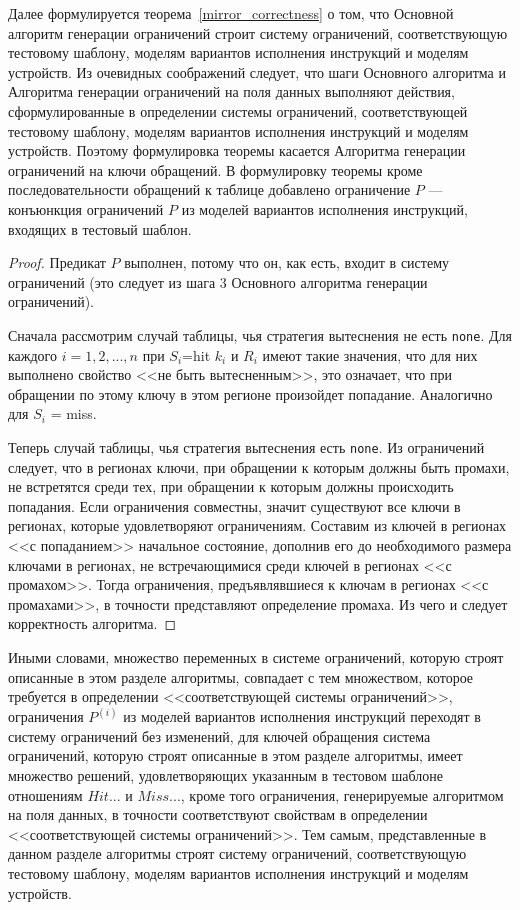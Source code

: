 Далее формулируется теорема~\ref{mirror_correctness} о том, что Основной алгоритм генерации ограничений строит систему ограничений, соответствующую тестовому шаблону, моделям вариантов исполнения инструкций и моделям устройств. Из очевидных соображений следует, что шаги Основного алгоритма и Алгоритма генерации ограничений на поля данных выполняют действия, сформулированные в определении системы ограничений, соответствующей тестовому шаблону, моделям вариантов исполнения инструкций и моделям устройств. Поэтому формулировка теоремы касается Алгоритма генерации ограничений на ключи обращений. В формулировку теоремы кроме последовательности обращений к таблице добавлено ограничение $P$ --- конъюнкция ограничений $P$ из моделей вариантов исполнения инструкций, входящих в тестовый шаблон.

\begin{theorem}\label{mirror_correctness}
\CorrectnessMirror
\end{theorem}
\begin{proof}
  Предикат $P$ выполнен, потому что он, как есть, входит в систему ограничений (это следует из шага 3 Основного алгоритма генерации ограничений).

  Сначала рассмотрим случай таблицы, чья стратегия вытеснения не есть \texttt{none}. Для каждого $i = 1, 2, ..., n$ при $S_i${=}hit  $k_i$ и $R_i$ имеют такие значения, что для них выполнено свойство <<не быть вытесненным>>, это означает, что при обращении по этому ключу в этом регионе произойдет попадание. Аналогично для $S_i$ = miss.

  Теперь случай таблицы, чья стратегия вытеснения есть \texttt{none}. Из ограничений следует, что в регионах ключи, при обращении к которым должны быть промахи, не встретятся среди тех, при обращении к которым должны происходить попадания. Если ограничения совместны, значит существуют все ключи в регионах, которые удовлетворяют ограничениям. Составим из ключей в регионах <<с попаданием>> начальное состояние, дополнив его до необходимого размера ключами в регионах, не встречающимися среди ключей в регионах <<с промахом>>. Тогда ограничения, предъявлявшиеся к ключам в регионах <<с промахами>>, в точности представляют определение промаха. Из чего и следует корректность алгоритма.
\end{proof}

Иными словами, множество переменных в системе ограничений, которую строят описанные в этом разделе алгоритмы, совпадает с тем множеством, которое требуется в определении <<соответствующей системы ограничений>>, ограничения $P^{(i)}$ из моделей вариантов исполнения инструкций переходят в систему ограничений без изменений, для ключей обращения система ограничений, которую строят описанные в этом разделе алгоритмы, имеет множество решений, удовлетворяющих указанным в тестовом шаблоне отношениям $Hit...$ и $Miss...$, кроме того ограничения, генерируемые алгоритмом на поля данных, в точности соответствуют свойствам в определении <<соответствующей системы ограничений>>. Тем самым, представленные в данном разделе алгоритмы строят систему ограничений, соответствующую тестовому шаблону, моделям вариантов исполнения инструкций и моделям устройств.

